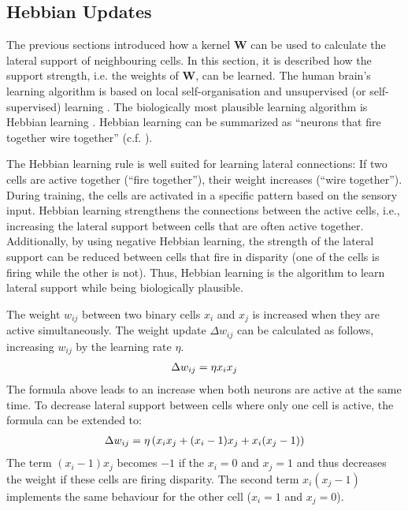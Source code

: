 \subsection{Hebbian Updates}
The previous sections introduced how a kernel $\boldsymbol{W}$ can be used to calculate the lateral support of neighbouring cells.
In this section, it is described how the support strength, i.e. the weights of $\boldsymbol{W}$, can be learned.
The human brain's learning algorithm is based on local self-organisation and unsupervised (or self-supervised) learning . The biologically most plausible learning algorithm is Hebbian learning . Hebbian learning can be summarized as ``neurons that fire together wire together'' (c.f. ).

The Hebbian learning rule is well suited for learning lateral connections: If two cells are active together (``fire together''), their weight increases (``wire together''). During training, the cells are activated in a specific pattern based on the sensory input. Hebbian learning strengthens the connections between the active cells, i.e., increasing the lateral support between cells that are often active together. Additionally, by using negative Hebbian learning, the strength of the lateral support can be reduced between cells that fire in disparity (one of the cells is firing while the other is not).
Thus, Hebbian learning is the algorithm to learn lateral support while being biologically plausible.

The weight $w_{ij}$ between two binary cells $x_i$ and $x_j$ is increased when they are active simultaneously. The weight update $\Delta w_{ij}$ can be calculated as follows, increasing $w_{ij}$ by the learning rate $\eta$.
\begin{align}\eqlbl{hebbu_1}
	\Delta w_{ij} = \eta x_i x_j
\end{align}
The formula above leads to an increase when both neurons are active at the same time. To decrease lateral support between cells where only one cell is active, the formula can be extended to:
\begin{align}\eqlbl{hebbu_2}
	\Delta w_{ij} = \eta \left( x_i x_j + (x_i-1) x_j + x_i (x_j -1) \right)
\end{align}
The term $(x_i-1) x_j$ becomes $-1$ if the $x_i=0$ and $x_j=1$ and thus decreases the weight if these cells are firing disparity. The second term $x_i (x_j -1)$ implements the same behaviour for the other cell ($x_i=1$ and $x_j=0$).

